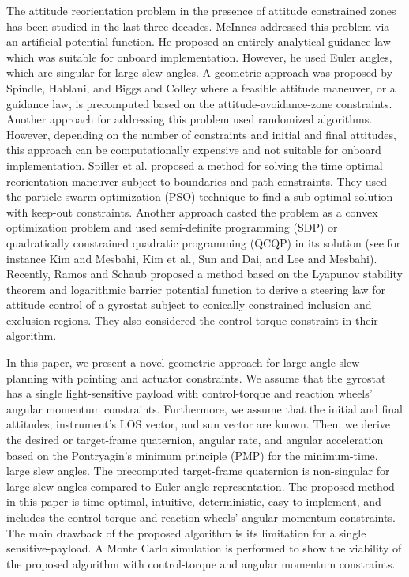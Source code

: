 \documentclass[journal ]{new-aiaa}
\begin{document}
	The attitude reorientation problem in the presence of attitude constrained zones has been studied in the last three decades. McInnes\cite{McInnes1994} addressed this problem via an artificial potential function. He proposed an entirely analytical guidance law which was suitable for onboard implementation. However, he used Euler angles, which are singular for large slew angles. 
	A geometric approach was proposed by Spindle\cite{Spindler1998}, Hablani\cite{Hablani1998}, and Biggs and Colley\cite{Biggs2016}  where a feasible attitude maneuver, or a guidance law, is precomputed based on the attitude-avoidance-zone constraints.  Another approach for addressing this problem used randomized algorithms\cite{Frazzoli01}. However, depending on the number of constraints and initial and final attitudes, this approach can be computationally expensive and not suitable for onboard implementation. Spiller et al.\cite{Spiller2016} proposed a method for solving the time optimal reorientation maneuver subject to boundaries and path constraints. They used the particle swarm optimization (PSO) technique to find a sub-optimal solution with keep-out constraints. Another approach casted the problem as a convex optimization problem and used semi-definite programming (SDP) or quadratically constrained quadratic programming (QCQP) in its solution (see for instance Kim and Mesbahi\cite{Kim2004}, Kim et al.\cite{Kim2010}, Sun and Dai\cite{Sun2015}, and Lee and Mesbahi\cite{Lee2014}). Recently, Ramos and Schaub\cite{Ramos2018} proposed a method based on the Lyapunov stability theorem and logarithmic barrier potential function to derive a steering law for attitude control of a gyrostat subject to conically constrained inclusion and exclusion regions. They also considered the control-torque constraint in their algorithm.  
	
In this paper, we present a novel geometric approach for large-angle slew planning with pointing and actuator constraints. We assume that the gyrostat has a single light-sensitive payload with control-torque and reaction wheels' angular momentum constraints. Furthermore, we assume that the initial and final attitudes, instrument's LOS vector, and sun vector are known. Then, we derive the desired or target-frame quaternion, angular rate, and angular acceleration based on the Pontryagin's minimum principle (PMP) for the minimum-time, large slew angles. The precomputed target-frame quaternion is non-singular for large slew angles compared to Euler angle representation. The proposed method in this paper is time optimal, intuitive, deterministic, easy to implement, and includes the control-torque and reaction wheels' angular momentum constraints. The main drawback of the proposed algorithm is its limitation for a single sensitive-payload.  A Monte Carlo simulation is performed to show the viability of the proposed algorithm with control-torque and angular momentum constraints. 
	
\end{document}
